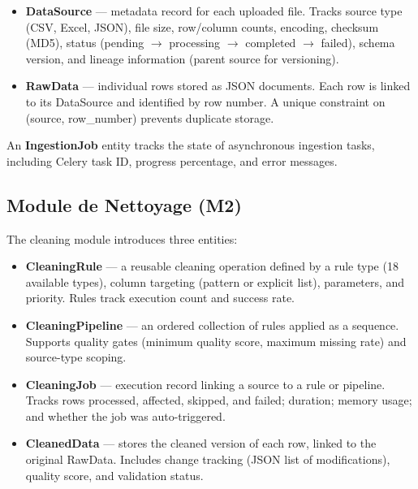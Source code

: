 \begin{itemize}
  \item \textbf{DataSource} — metadata record for each
        uploaded file. Tracks source type (CSV, Excel, JSON),
        file size, row/column counts, encoding,
        checksum (MD5), status (pending $\rightarrow$
        processing $\rightarrow$ completed $\rightarrow$ failed),
        schema version, and lineage information
        (parent source for versioning).
  \item \textbf{RawData} — individual rows stored as
        JSON documents. Each row is linked to its
        DataSource and identified by row number.
        A unique constraint on (source, row\_number)
        prevents duplicate storage.
\end{itemize}

\noindent
An \textbf{IngestionJob} entity tracks the state
of asynchronous ingestion tasks, including
Celery task ID, progress percentage, and error messages.

\subsection{Module de Nettoyage (M2)}

\noindent
The cleaning module introduces three entities:

\begin{itemize}
  \item \textbf{CleaningRule} — a reusable cleaning operation
        defined by a rule type (18 available types),
        column targeting (pattern or explicit list),
        parameters, and priority. Rules track
        execution count and success rate.
  \item \textbf{CleaningPipeline} — an ordered collection
        of rules applied as a sequence.
        Supports quality gates (minimum quality score,
        maximum missing rate) and source-type scoping.
  \item \textbf{CleaningJob} — execution record
        linking a source to a rule or pipeline.
        Tracks rows processed, affected, skipped,
        and failed; duration; memory usage;
        and whether the job was auto-triggered.
  \item \textbf{CleanedData} — stores the cleaned version
        of each row, linked to the original RawData.
        Includes change tracking (JSON list of modifications),
        quality score, and validation status.
\end{itemize}


